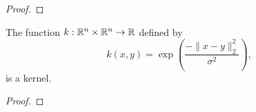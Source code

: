 \begin{theorem}
    \label{thm:constructing-kernels}
    \cite{rudin2020notes,shawe2004kernel}
    
\end{theorem}
\begin{proof}
    
\end{proof}

\begin{theorem}
    \label{thm:gaussian-kernel}
    The function \(k : \mathbb{R}^n \times \mathbb{R}^n \to \mathbb{R}\) defined by
    \begin{equation}
        \label{eqn:gaussian-kernel}
        k(x,y) = \exp\left(\frac{-\|x-y\|^2_2}{\sigma^2}\right),
    \end{equation}
    is a kernel.
\end{theorem}

\begin{proof}
    
\end{proof}